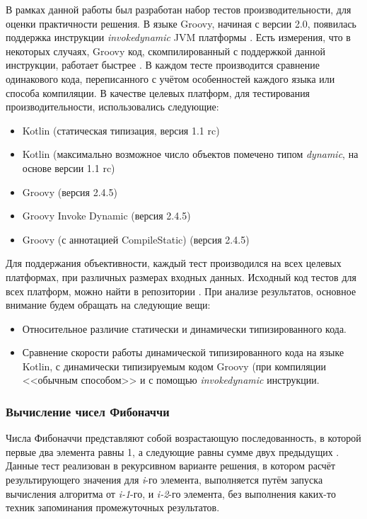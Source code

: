 В рамках данной работы был разработан набор тестов производительности, для оценки практичности решения. В языке Groovy, начиная с версии 2.0, появилась поддержка инструкции \textit{invokedynamic} JVM платформы \cite{groovy:invokeDynamicSupport}. Есть измерения, что в некоторых случаях, Groovy код, скомпилированный с поддержкой данной инструкции, работает быстрее \cite{groovy:indyTest1}.
В каждом тесте производится сравнение одинакового кода, переписанного с учётом особенностей каждого языка или способа компиляции. В качестве целевых платформ, для тестирования производительности, использовались следующие:

\begin{itemize}
    \item Kotlin (статическая типизация, версия 1.1 rc) 
    \item Kotlin (максимально возможное число объектов помечено типом \textit{dynamic}, на основе версии 1.1 rc)
    \item Groovy (версия 2.4.5)
    \item Groovy Invoke Dynamic (версия 2.4.5)
    \item Groovy (с аннотацией \at CompileStatic) (версия 2.4.5)
\end{itemize}


Для поддержания объективности, каждый тест производился на всех целевых платформах, при различных размерах входных данных. Исходный код тестов для всех платформ, можно найти в репозитории \cite{github:myBenchs}. При анализе результатов, основное внимание будем обращать на следующие вещи:

\begin{itemize}
    \item Относительное различие статически и динамически типизированного кода.
    \item Сравнение скорости работы динамической типизированного кода на языке Kotlin, с динамически типизируемым кодом Groovy (при компиляции <<обычным способом>> и с помощью \textit{invokedynamic} инструкции.
\end{itemize}

\subsubsection{Вычисление чисел Фибоначчи}

Числа Фибоначчи представляют собой возрастающую последованность, в которой первые два элемента равны 1, а следующие равны сумме двух предыдущих \cite{math:vilenkin1969Combinatorics}. Данные тест реализован в рекурсивном варианте решения, в котором расчёт результирующего значения для \textit{i}-го элемента, выполняется путём запуска вычисления алгоритма от \textit{i-1}-го, и \textit{i-2}-го элемента, без выполнения каких-то техник запоминания промежуточных результатов.

